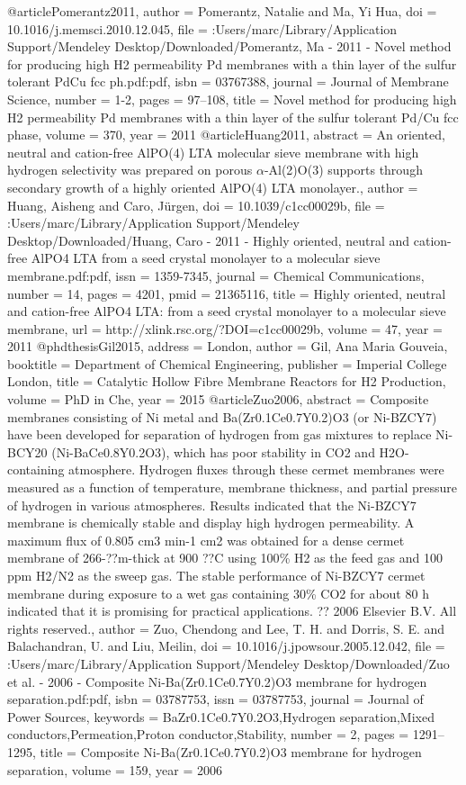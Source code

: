 @article{Pomerantz2011,
author = {Pomerantz, Natalie and Ma, Yi Hua},
doi = {10.1016/j.memsci.2010.12.045},
file = {:Users/marc/Library/Application Support/Mendeley Desktop/Downloaded/Pomerantz, Ma - 2011 - Novel method for producing high H2 permeability Pd membranes with a thin layer of the sulfur tolerant PdCu fcc ph.pdf:pdf},
isbn = {03767388},
journal = {Journal of Membrane Science},
number = {1-2},
pages = {97--108},
title = {{Novel method for producing high H2 permeability Pd membranes with a thin layer of the sulfur tolerant Pd/Cu fcc phase}},
volume = {370},
year = {2011}
}
@article{Huang2011,
abstract = {An oriented, neutral and cation-free AlPO(4) LTA molecular sieve membrane with high hydrogen selectivity was prepared on porous $\alpha$-Al(2)O(3) supports through secondary growth of a highly oriented AlPO(4) LTA monolayer.},
author = {Huang, Aisheng and Caro, J{\"{u}}rgen},
doi = {10.1039/c1cc00029b},
file = {:Users/marc/Library/Application Support/Mendeley Desktop/Downloaded/Huang, Caro - 2011 - Highly oriented, neutral and cation-free AlPO4 LTA from a seed crystal monolayer to a molecular sieve membrane.pdf:pdf},
issn = {1359-7345},
journal = {Chemical Communications},
number = {14},
pages = {4201},
pmid = {21365116},
title = {{Highly oriented, neutral and cation-free AlPO4 LTA: from a seed crystal monolayer to a molecular sieve membrane}},
url = {http://xlink.rsc.org/?DOI=c1cc00029b},
volume = {47},
year = {2011}
}
@phdthesis{Gil2015,
address = {London},
author = {Gil, Ana Maria Gouveia},
booktitle = {Department of Chemical Engineering},
publisher = {Imperial College London},
title = {{Catalytic Hollow Fibre Membrane Reactors for H2 Production}},
volume = {PhD in Che},
year = {2015}
}
@article{Zuo2006,
abstract = {Composite membranes consisting of Ni metal and Ba(Zr0.1Ce0.7Y0.2)O3 (or Ni-BZCY7) have been developed for separation of hydrogen from gas mixtures to replace Ni-BCY20 (Ni-BaCe0.8Y0.2O3), which has poor stability in CO2 and H2O-containing atmosphere. Hydrogen fluxes through these cermet membranes were measured as a function of temperature, membrane thickness, and partial pressure of hydrogen in various atmospheres. Results indicated that the Ni-BZCY7 membrane is chemically stable and display high hydrogen permeability. A maximum flux of 0.805 cm3 min-1 cm2 was obtained for a dense cermet membrane of 266-??m-thick at 900 ??C using 100{\%} H2 as the feed gas and 100 ppm H2/N2 as the sweep gas. The stable performance of Ni-BZCY7 cermet membrane during exposure to a wet gas containing 30{\%} CO2 for about 80 h indicated that it is promising for practical applications. ?? 2006 Elsevier B.V. All rights reserved.},
author = {Zuo, Chendong and Lee, T. H. and Dorris, S. E. and Balachandran, U. and Liu, Meilin},
doi = {10.1016/j.jpowsour.2005.12.042},
file = {:Users/marc/Library/Application Support/Mendeley Desktop/Downloaded/Zuo et al. - 2006 - Composite Ni-Ba(Zr0.1Ce0.7Y0.2)O3 membrane for hydrogen separation.pdf:pdf},
isbn = {03787753},
issn = {03787753},
journal = {Journal of Power Sources},
keywords = {BaZr0.1Ce0.7Y0.2O3,Hydrogen separation,Mixed conductors,Permeation,Proton conductor,Stability},
number = {2},
pages = {1291--1295},
title = {{Composite Ni-Ba(Zr0.1Ce0.7Y0.2)O3 membrane for hydrogen separation}},
volume = {159},
year = {2006}
}
